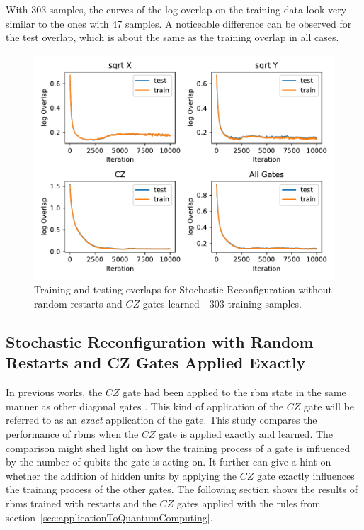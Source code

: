 With 303 samples, the curves of the log overlap on the training data look very similar to the 
ones with 47 samples. A noticeable difference can be observed for the test overlap, which is 
about the same as the training overlap in all cases.

\begin{figure}[H]
  \centering
  \includegraphics[width=\textwidth]{figures/results/sr-no-restarts-learned/avgOverlap_303.pdf}
  \caption[Training and Testing Overlaps for Stochastic Reconfiguration without Random Restarts and $CZ$ Gates Learned - 303 Samples]{ 
  Training and testing overlaps for Stochastic Reconfiguration without random restarts and $CZ$ gates learned - 303 training samples.}
  \label{fig:sr_no_restarts_overlap_303}
\end{figure}

\newpage

\subsection{Stochastic Reconfiguration with Random Restarts and CZ Gates Applied Exactly}

In previous works, the $CZ$ gate had been applied to the \gls{rbm} state in the same manner as 
other diagonal gates \cite{jnsson2018neuralnetwork}. This kind of application of the $CZ$ gate 
will be referred to as an \textit{exact} application of the gate. This study compares 
the performance of \gls{rbm}s when the $CZ$ gate is applied exactly and learned. The comparison might shed
light on how the training process of a gate is influenced by the number of qubits the gate 
is acting on. It further can give a hint on whether the addition of hidden units by applying the $CZ$
gate exactly influences the training process of the other gates.
The following section shows the results of \gls{rbm}s trained with restarts and the $CZ$ gates applied 
with the rules from section~\ref{sec:applicationToQuantumComputing}.

